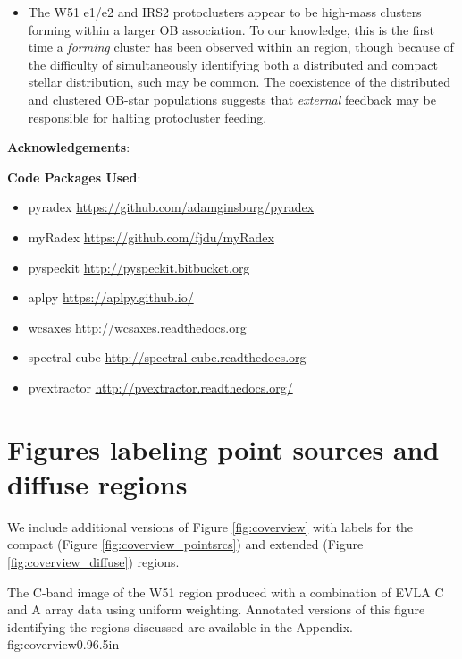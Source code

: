 \begin{itemize}
\item The W51 e1/e2 and IRS2 protoclusters appear to be high-mass clusters
    forming within a larger OB association.  To our knowledge, this is the
    first time a \emph{forming} cluster has been observed within an \hii
    region, though because of the difficulty of simultaneously identifying both
    a distributed and compact stellar distribution, such may be common.  The
    coexistence of the distributed and clustered OB-star populations suggests
    that \emph{external} feedback may be responsible for halting protocluster
    feeding.

\end{itemize}




\textbf{Acknowledgements}:

\textbf{Code Packages Used}:

\begin{itemize}
    \item pyradex \url{https://github.com/adamginsburg/pyradex}
    \item myRadex \url{https://github.com/fjdu/myRadex}
    \item pyspeckit \url{http://pyspeckit.bitbucket.org}
    \item aplpy \url{https://aplpy.github.io/}
    \item wcsaxes \url{http://wcsaxes.readthedocs.org}
    \item spectral cube \url{http://spectral-cube.readthedocs.org}
    \item pvextractor \url{http://pvextractor.readthedocs.org/}
\end{itemize}



\appendix
\section{Figures labeling point sources and diffuse regions}
\label{sec:appendix_labels}
We include additional versions of Figure \ref{fig:coverview} with labels for
the compact (Figure \ref{fig:coverview_pointsrcs}) and extended (Figure
\ref{fig:coverview_diffuse}) \hii regions.

{The C-band image of the W51 region produced with a combination of EVLA
C and A array data using uniform weighting.  Annotated versions of this figure
identifying the regions discussed are available in the Appendix.}
{fig:coverview}{0.9}{6.5in}


